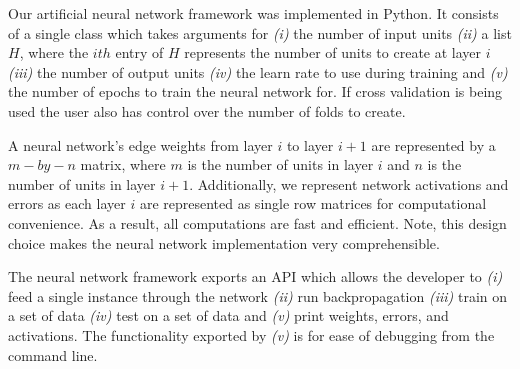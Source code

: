 Our artificial neural network framework was implemented in Python.
It consists of a single class which takes arguments for {\em (i)} the number of input units {\em (ii)} a list \(H\), where the \(ith\) entry of \(H\) represents the number of units to create at layer \(i\) {\em (iii)} the number of output units {\em (iv)} the learn rate to use during training and {\em (v)} the number of epochs to train the neural network for.
If cross validation is being used the user also has control over the number of folds to create.

A neural network's edge weights from layer \(i\) to layer \(i+1\) are represented by a \(m-by-n\) matrix, where \(m\) is the number of units in layer \(i\) and \(n\) is the number of units in layer \(i+1\).
Additionally, we represent network activations and errors as each layer \(i\) are represented as single row matrices for computational convenience.
As a result, all computations are fast and efficient.
Note, this design choice makes the neural network implementation very comprehensible.

The neural network framework exports an API which allows the developer to {\em (i)} feed a single instance through the network {\em (ii)} run backpropagation {\em (iii)} train on a set of data {\em (iv)} test on a set of data and {\em (v)} print weights, errors, and activations.
The functionality exported by {\em (v)} is for ease of debugging from the command line.

